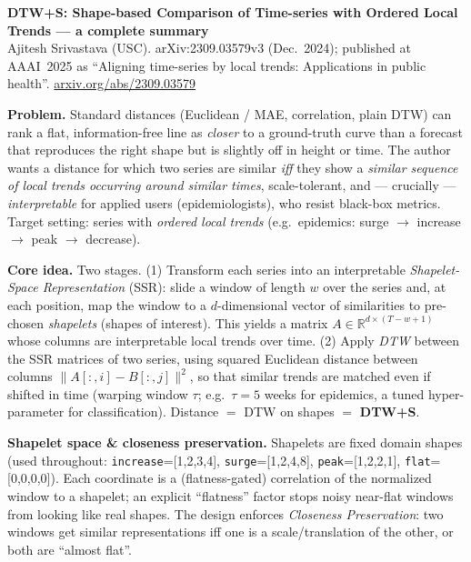 \documentclass[10pt]{article}
\newcommand{\head}[1]{\smallskip\noindent\textbf{#1}\quad}
\begin{document}
{\large\textbf{DTW+S: Shape-based Comparison of Time-series with Ordered Local Trends --- a complete summary}}\\[2pt]
{\small Ajitesh Srivastava (USC). arXiv:2309.03579v3 (Dec.\ 2024); published at AAAI~2025 as
``Aligning time-series by local trends: Applications in public health''.
\href{https://arxiv.org/abs/2309.03579}{arxiv.org/abs/2309.03579}}

\head{Problem.} Standard distances (Euclidean / MAE, correlation, plain DTW) can rank a flat,
information-free line as \emph{closer} to a ground-truth curve than a forecast that reproduces
the right shape but is slightly off in height or time. The author wants a distance for which two
series are similar \emph{iff} they show a \emph{similar sequence of local trends occurring around
similar times}, scale-tolerant, and --- crucially --- \emph{interpretable} for applied users
(epidemiologists), who resist black-box metrics. Target setting: series with \emph{ordered local
trends} (e.g.\ epidemics: surge $\to$ increase $\to$ peak $\to$ decrease).

\head{Core idea.} Two stages. (1) Transform each series into an interpretable
\emph{Shapelet-Space Representation} (SSR): slide a window of length $w$ over the series and, at
each position, map the window to a $d$-dimensional vector of similarities to pre-chosen
\emph{shapelets} (shapes of interest). This yields a matrix $A\in\mathbb{R}^{d\times(T-w+1)}$ whose
columns are interpretable local trends over time. (2) Apply \emph{DTW} between the SSR matrices of
two series, using squared Euclidean distance between columns $\lVert A[:,i]-B[:,j]\rVert^2$, so that
similar trends are matched even if shifted in time (warping window $\tau$; e.g.\ $\tau=5$ weeks for
epidemics, a tuned hyper-parameter for classification). Distance $=$ DTW on shapes $=$ \textbf{DTW+S}.

\head{Shapelet space \& closeness preservation.} Shapelets are fixed domain shapes (used throughout:
\texttt{increase}=[1,2,3,4], \texttt{surge}=[1,2,4,8], \texttt{peak}=[1,2,2,1], \texttt{flat}=[0,0,0,0]).
Each coordinate is a (flatness-gated) correlation of the normalized window to a shapelet; an explicit
``flatness'' factor stops noisy near-flat windows from looking like real shapes. The design enforces
\emph{Closeness Preservation}: two windows get similar representations iff one is a scale/translation of
the other, or both are ``almost flat''.
\end{document}
